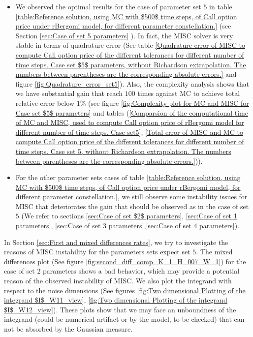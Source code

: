 \documentclass[11pt]{article}
\begin{document}
\begin{itemize}
	\item We observed the optimal results for the case of parameter set $5$ in table \ref{table:Reference solution, using MC with $500$ time steps, of Call option price under rBergomi model, for different parameter constellation.} (see Section \ref{sec:Case of set 5 parameters} ). In fact, the MISC solver is very stable in terms of quadrature error (See table \ref{Quadrature error of MISC to compute Call option price of the different tolerances for different number of time steps. Case  set $5$ parameters, without Richardson extrapolation. The numbers between parentheses are the corresponding absolute errors.} and figure \ref{fig:Quadrature_error_set5}). Also, the complexity analysis shows that we have substantial gain that reach $100$ times against MC to achieve total relative error below $1\%$ (see figure \ref{fig:Complexity plot for MC and MISC for Case set $5$ parameters} and tables (\ref{Comparsion of the computational time of  MC and MISC, used to compute Call option price of rBergomi model for different number of time steps. Case set5}, \ref{Total error of MISC and MC to compute Call option price of the different tolerances for different number of time steps. Case set 5, without Richardson extrapolation. The numbers between parentheses are the corresponding absolute errors.})).
	\item For the other parameter sets cases of table \ref{table:Reference solution, using MC with $500$ time steps, of Call option price under rBergomi model, for different parameter constellation.}, we still observe some instability issues for MISC that deteriorates the gain that should be observed as in the case of set $5$ (We refer to sections \ref{sec:Case of set $2$ parameters}, \ref{sec:Case of set 1 parameters}, \ref{sec:Case of set 3 parameters},\ref{sec:Case of set 4 parameters}). 
\end{itemize}


In Section \ref{sec:First and mixed differences rates}, we try to investigate the reasons of MISC instability for the parameters sets expect set $5$. The mixed differences plot (See figure \ref{fig:second_diff_comp_K_1_H_007_W_1})  for the  case of set $2$ parameters shows a bad behavior, which  may provide a potential reason of the observed instability of  MISC.  We also plot the integrand with respect to the noise dimensions  (See figures \ref{fig:Two dimensional Plotting of the integrand $I$_W11_view}, \ref{fig:Two dimensional Plotting of the integrand $I$_W12_view}). These plots show that we may face an unboundness of the integrand (could be numerical artifact or by the model, to be checked) that can not be absorbed by the Gaussian measure.
\end{document}
